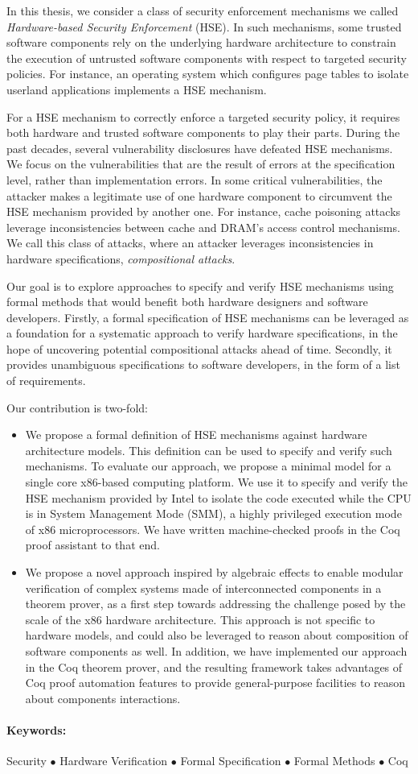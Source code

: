 In this thesis, we consider a class of security enforcement mechanisms we called
\emph{Hardware-based Security Enforcement} (HSE).
%
In such mechanisms, some trusted software components rely on the underlying
hardware architecture to constrain the execution of untrusted software
components with respect to targeted security policies.
%
For instance, an operating system which configures page tables to isolate userland
applications implements a HSE mechanism.

For a HSE mechanism to correctly enforce a targeted security policy, it requires
both hardware and trusted software components to play their parts.
%
During the past decades, several vulnerability disclosures have defeated HSE
mechanisms.
%
We focus on the vulnerabilities that are the result of errors at the
specification level, rather than implementation errors.
%
In some critical vulnerabilities, the attacker makes a legitimate use of one
hardware component to circumvent the HSE mechanism provided by another one.
%
For instance, cache poisoning attacks leverage inconsistencies between cache
and DRAM's access control mechanisms.
%
We call this class of attacks, where an attacker leverages inconsistencies in
hardware specifications, \emph{compositional attacks}.

Our goal is to explore approaches to specify and verify HSE mechanisms using
formal methods that would benefit both hardware designers and software
developers.
%
Firstly, a formal specification of HSE mechanisms can be leveraged as a
foundation for a systematic approach to verify hardware specifications, in the
hope of uncovering potential compositional attacks ahead of time.
%
Secondly, it provides unambiguous specifications to software developers, in the
form of a list of requirements.

Our contribution is two-fold:
%
\begin{itemize}
\item We propose a formal definition of HSE mechanisms against hardware
  architecture models. This definition can be used to specify and verify such mechanisms.
  To evaluate our approach, we propose a minimal model for a single core
  x86-based computing platform.
  We use it to specify and verify the HSE mechanism provided by Intel to isolate
  the code executed while the CPU is in System Management Mode (SMM), a highly
  privileged execution mode of x86 microprocessors.
  We have written machine-checked proofs in the Coq proof assistant to that
  end.
\item We propose a novel approach inspired by algebraic effects to enable
  modular verification of complex systems made of interconnected components in a
  theorem prover, as a first step towards addressing the challenge posed by the
  scale of the x86 hardware architecture.
  This approach is not specific to hardware models, and could also be leveraged
  to reason about composition of software components as well.
  In addition, we have implemented our approach in the Coq theorem prover, and
  the resulting framework takes advantages of Coq proof automation features to
  provide general-purpose facilities to reason about components interactions.
\end{itemize}

\paragraph{Keywords:}
%
Security $\bullet$ Hardware Verification $\bullet$ Formal Specification
$\bullet$ Formal Methods $\bullet$ Coq
